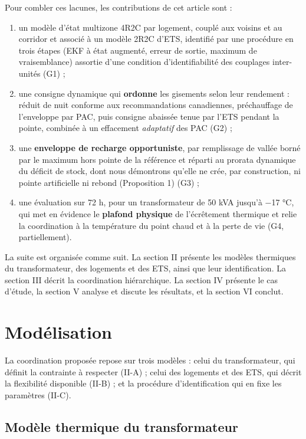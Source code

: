 \documentclass[conference]{IEEEtran}
\providecommand{\tightlist}{\setlength{\itemsep}{0pt}\setlength{\parskip}{0pt}}
\begin{document}
Pour combler ces lacunes, les contributions de cet article sont :

\begin{enumerate}
\def\labelenumi{\arabic{enumi}.}
\tightlist
\item
  un modèle d'état multizone 4R2C par logement, couplé aux voisins et au corridor et associé à un modèle 2R2C d'ETS, identifié par une procédure en trois étapes (EKF à état augmenté, erreur de sortie, maximum de vraisemblance) assortie d'une condition d'identifiabilité des couplages inter-unités (G1) ;
\item
  une consigne dynamique qui \textbf{ordonne} les gisements selon leur rendement : réduit de nuit conforme aux recommandations canadiennes, préchauffage de l'enveloppe par PAC, puis consigne abaissée tenue par l'ETS pendant la pointe, combinée à un effacement \emph{adaptatif} des PAC (G2) ;
\item
  une \textbf{enveloppe de recharge opportuniste}, par remplissage de vallée borné par le maximum hors pointe de la référence et réparti au prorata dynamique du déficit de stock, dont nous démontrons qu'elle ne crée, par construction, ni pointe artificielle ni rebond (Proposition 1) (G3) ;
\item
  une évaluation sur 72 h, pour un transformateur de 50 kVA jusqu'à −17 °C, qui met en évidence le \textbf{plafond physique} de l'écrêtement thermique et relie la coordination à la température du point chaud et à la perte de vie (G4, partiellement).
\end{enumerate}

La suite est organisée comme suit. La section II présente les modèles thermiques du transformateur, des logements et des ETS, ainsi que leur identification. La section III décrit la coordination hiérarchique. La section IV présente le cas d'étude, la section V analyse et discute les résultats, et la section VI conclut.

\section{Modélisation}

La coordination proposée repose sur trois modèles : celui du transformateur, qui définit la contrainte à respecter (II-A) ; celui des logements et des ETS, qui décrit la flexibilité disponible (II-B) ; et la procédure d'identification qui en fixe les paramètres (II-C).

\subsection{Modèle thermique du transformateur}
\end{document}
